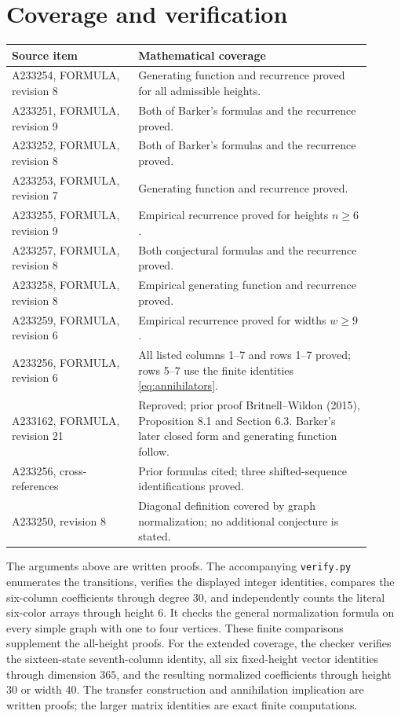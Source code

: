 \documentclass[11pt]{article}
\begin{document}
\section{Coverage and verification}
\begin{center}\small
\begin{tabular}{p{0.32\linewidth}p{0.59\linewidth}}
\toprule
Source item & Mathematical coverage\\\midrule
A233254, FORMULA, revision 8 & Generating function and recurrence proved for all admissible heights.\\
A233251, FORMULA, revision 9 & Both of Barker's formulas and the recurrence proved.\\
A233252, FORMULA, revision 8 & Both of Barker's formulas and the recurrence proved.\\
A233253, FORMULA, revision 7 & Generating function and recurrence proved.\\
A233255, FORMULA, revision 9 & Empirical recurrence proved for heights $n\ge6$.\\
A233257, FORMULA, revision 8 & Both conjectural formulas and the recurrence proved.\\
A233258, FORMULA, revision 8 & Empirical generating function and recurrence proved.\\
A233259, FORMULA, revision 6 & Empirical recurrence proved for widths $w\ge9$.\\
A233256, FORMULA, revision 6 & All listed columns 1--7 and rows 1--7 proved; rows 5--7 use the finite identities \eqref{eq:annihilators}.\\
A233162, FORMULA, revision 21 & Reproved; prior proof Britnell--Wildon (2015), Proposition 8.1 and Section 6.3. Barker's later closed form and generating function follow.\\
A233256, cross-references & Prior formulas cited; three shifted-sequence identifications proved.\\
A233250, revision 8 & Diagonal definition covered by graph normalization; no additional conjecture is stated.\\
\bottomrule
\end{tabular}
\end{center}
The arguments above are written proofs. The accompanying \texttt{verify.py}
enumerates the transitions, verifies the displayed integer identities, compares
the six-column coefficients through degree $30$, and independently counts
the literal six-color arrays through height $6$. It checks the general
normalization formula on every simple graph with one to four vertices.
These finite comparisons supplement the all-height proofs.
For the extended coverage, the checker verifies the sixteen-state seventh-column
identity, all six fixed-height vector identities through dimension $365$,
and the resulting normalized coefficients through height $30$ or width $40$.
The transfer construction and annihilation implication are written proofs;
the larger matrix identities are exact finite computations.
\end{document}
